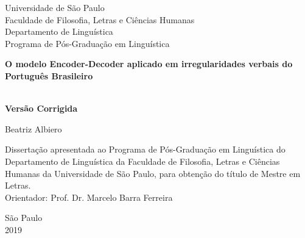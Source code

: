 \thispagestyle{empty}

\begin{center}
    Universidade de São Paulo\\
    Faculdade de Filosofia, Letras e Ciências Humanas\\
    Departamento de Linguística\\
    Programa de Pós-Graduação em Linguística 
\end{center}
\begin{center}
    \vspace*{1.3cm}
    \textbf{\Large{O modelo Encoder-Decoder aplicado em irregularidades verbais do Português Brasileiro\\
    
}}\\
\end{center}
\vspace{0.5 cm}
\begin{center}
  \normalsize{\textbf{Versão Corrigida}}  
\end{center}

\vspace{1.0 cm}

\begin{center}
\Large{Beatriz Albiero}
\end{center}

\vspace*{3cm}  
\hfill\begin{minipage}{0.5\linewidth}
  Dissertação apresentada ao Programa de Pós-Graduação em Linguística do Departamento de Linguística da Faculdade de Filosofia, Letras e Ciências Humanas da Universidade de São Paulo, para obtenção do título de Mestre em Letras. \\
   
  Orientador: Prof. Dr. Marcelo Barra Ferreira\\
  
  
  
 
\end{minipage}

 \begin{center}   
    \vskip 4.5cm
    \normalsize{São Paulo\\ 2019}
\end{center}